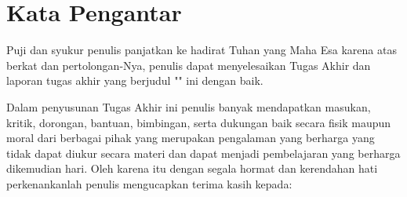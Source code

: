 \chapter*{Kata Pengantar}

Puji dan syukur penulis panjatkan ke hadirat Tuhan yang Maha Esa karena atas berkat dan pertolongan-Nya, penulis dapat menyelesaikan Tugas Akhir dan laporan tugas akhir yang berjudul "\thetitle" ini dengan baik. 

Dalam penyusunan Tugas Akhir ini penulis banyak mendapatkan masukan, kritik, dorongan, bantuan, bimbingan, serta dukungan baik secara fisik maupun moral dari berbagai pihak yang merupakan pengalaman yang berharga yang tidak dapat diukur secara materi dan dapat menjadi pembelajaran yang berharga dikemudian hari. Oleh karena itu dengan segala hormat dan kerendahan hati perkenankanlah penulis mengucapkan terima kasih kepada:

